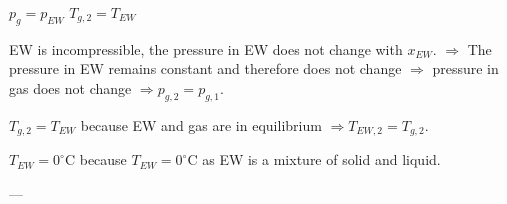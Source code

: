 \( p_g = p_{EW} \)  
\( T_{g,2} = T_{EW} \)  

EW is incompressible, the pressure in EW does not change with \( x_{EW} \).  
\( \Rightarrow \) The pressure in EW remains constant and therefore does not change \( \Rightarrow \) pressure in gas does not change \( \Rightarrow p_{g,2} = p_{g,1} \).  

\( T_{g,2} = T_{EW} \) because EW and gas are in equilibrium \( \Rightarrow T_{EW,2} = T_{g,2} \).  

\( T_{EW} = 0^\circ \text{C} \) because \( T_{EW} = 0^\circ \text{C} \) as EW is a mixture of solid and liquid.  

---